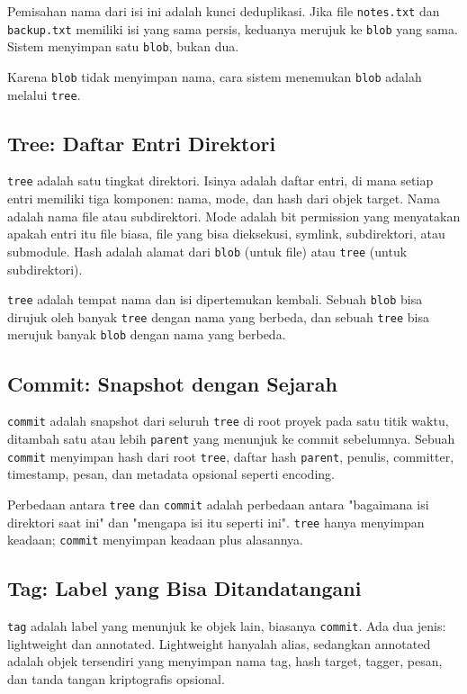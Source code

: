 \documentclass[11pt,a4paper]{article}
\begin{document}
Pemisahan nama dari isi ini adalah kunci deduplikasi. Jika file \texttt{notes.txt} dan \texttt{backup.txt} memiliki isi yang sama persis, keduanya merujuk ke \texttt{blob} yang sama. Sistem menyimpan satu \texttt{blob}, bukan dua.

Karena \texttt{blob} tidak menyimpan nama, cara sistem menemukan \texttt{blob} adalah melalui \texttt{tree}.

\subsection{Tree: Daftar Entri Direktori}

\texttt{tree} adalah satu tingkat direktori. Isinya adalah daftar entri, di mana setiap entri memiliki tiga komponen: nama, mode, dan hash dari objek target. Nama adalah nama file atau subdirektori. Mode adalah bit permission yang menyatakan apakah entri itu file biasa, file yang bisa dieksekusi, symlink, subdirektori, atau submodule. Hash adalah alamat dari \texttt{blob} (untuk file) atau \texttt{tree} (untuk subdirektori).

\texttt{tree} adalah tempat nama dan isi dipertemukan kembali. Sebuah \texttt{blob} bisa dirujuk oleh banyak \texttt{tree} dengan nama yang berbeda, dan sebuah \texttt{tree} bisa merujuk banyak \texttt{blob} dengan nama yang berbeda.

\subsection{Commit: Snapshot dengan Sejarah}

\texttt{commit} adalah snapshot dari seluruh \texttt{tree} di root proyek pada satu titik waktu, ditambah satu atau lebih \texttt{parent} yang menunjuk ke commit sebelumnya. Sebuah \texttt{commit} menyimpan hash dari root \texttt{tree}, daftar hash \texttt{parent}, penulis, committer, timestamp, pesan, dan metadata opsional seperti encoding.

Perbedaan antara \texttt{tree} dan \texttt{commit} adalah perbedaan antara "bagaimana isi direktori saat ini" dan "mengapa isi itu seperti ini". \texttt{tree} hanya menyimpan keadaan; \texttt{commit} menyimpan keadaan plus alasannya.

\subsection{Tag: Label yang Bisa Ditandatangani}

\texttt{tag} adalah label yang menunjuk ke objek lain, biasanya \texttt{commit}. Ada dua jenis: lightweight dan annotated. Lightweight hanyalah alias, sedangkan annotated adalah objek tersendiri yang menyimpan nama tag, hash target, tagger, pesan, dan tanda tangan kriptografis opsional.
\end{document}
